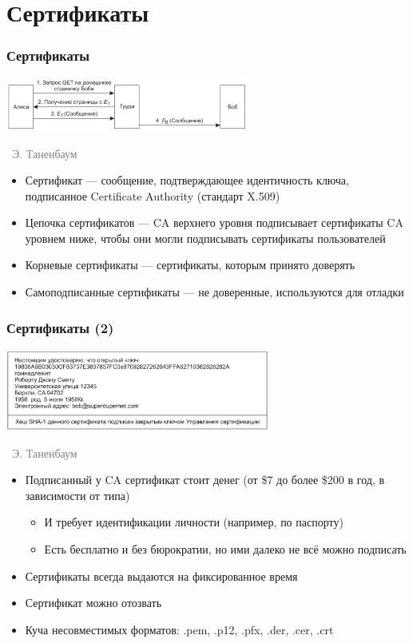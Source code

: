 \documentclass[xetex,mathserif,serif]{beamer}
\newcommand{\attribution}[1] {
\vspace{-5mm}\begin{flushright}\begin{scriptsize}\textcolor{gray}{\textcopyright\, #1}\end{scriptsize}\end{flushright}
}
\begin{document}
    \section{Сертификаты}

    \begin{frame}
        \frametitle{Сертификаты}
        \begin{center}
            \includegraphics[width=0.6\textwidth]{manInTheMiddle.png}
            \attribution{Э. Таненбаум}
        \end{center}
        \begin{itemize}
            \item Сертификат --- сообщение, подтверждающее идентичность ключа, подписанное Certificate Authority (стандарт X.509)
            \item Цепочка сертификатов --- CA верхнего уровня подписывает сертификаты CA уровнем ниже, чтобы они могли подписывать сертификаты пользователей
            \item Корневые сертификаты --- сертификаты, которым принято доверять
            \item Самоподписанные сертификаты --- не доверенные, используются для отладки
        \end{itemize}
    \end{frame}

    \begin{frame}
        \frametitle{Сертификаты (2)}
        \begin{center}
            \includegraphics[width=0.65\textwidth]{certificate.png}
            \attribution{Э. Таненбаум}
        \end{center}
        \begin{itemize}
            \item Подписанный у CA сертификат стоит денег (от \$7 до более \$200 в год, в зависимости от типа)
            \begin{itemize}
                \item И требует идентификации личности (например, по паспорту)
                \item Есть бесплатно и без бюрократии, но ими далеко не всё можно подписать
            \end{itemize}
            \item Сертификаты всегда выдаются на фиксированное время
            \item Сертификат можно отозвать
            \item Куча несовместимых форматов: .pem, .p12, .pfx, .der, .cer, .crt
        \end{itemize}
    \end{frame}
\end{document}
